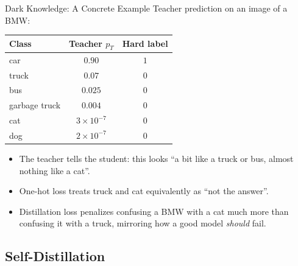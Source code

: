 \begin{frame}{Dark Knowledge: A Concrete Example}
  Teacher prediction on an image of a BMW:

  \vspace{0.4em}
  \begin{center}
    \begin{tabular}{l c c}
      \toprule
      \textbf{Class} & \textbf{Teacher $p_T$} & \textbf{Hard label} \\
      \midrule
      \textcolor{blue!60!black}{car}      & $0.90$                   & $1$ \\
      truck    & $0.07$                   & $0$ \\
      bus      & $0.025$                  & $0$ \\
      garbage truck & $0.004$            & $0$ \\
      \midrule
      cat      & $3 \times 10^{-7}$       & $0$ \\
      dog      & $2 \times 10^{-7}$       & $0$ \\
      \bottomrule
    \end{tabular}
  \end{center}

  \vspace{0.4em}
  \begin{itemize}[nosep]
    \item The teacher tells the student: this looks ``a bit like a truck or bus, almost nothing like a cat''.
    \item One-hot loss treats truck and cat equivalently as ``not the answer''.
    \item Distillation loss penalizes confusing a BMW with a cat much more than confusing it with a truck, mirroring how a good model \emph{should} fail.
  \end{itemize}
\end{frame}

\subsection{Self-Distillation}

